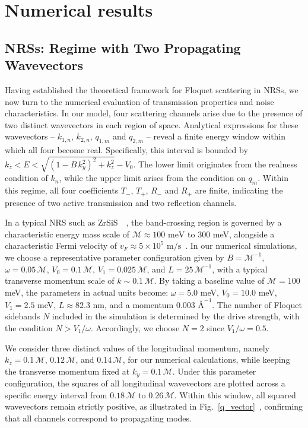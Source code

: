 \documentclass[aps,prb,onecolumn,longbibliography,nofootinbib,citeautoscript,10pt]{revtex4-2}
\begin{document}
\section{Numerical results}
\label{secresults}

\subsection{NRSs: Regime with Two Propagating Wavevectors}

Having established the theoretical framework for Floquet scattering in NRSs, we now turn to the numerical evaluation of transmission properties and noise characteristics. In our model, four scattering channels arise due to the presence of two distinct wavevectors in each region of space. Analytical expressions for these wavevectors – $k_{1,n}$, $k_{2,n}$, $q_{1,m}$ and $q_{2,m}$ – reveal a finite energy window within which all four become real. Specifically, this interval is bounded by $k_z<E<\sqrt{(1-B\, k_y^2)^2 +k_z^2}-V_0$. The lower limit originates from the realness condition of $k_n$, while the upper limit arises from the condition on $q_m$. Within this regime, all four coefficients $T_-$, $T_+$, $R_-$ and $R_+$ are finite, indicating the presence of two active transmission and two reflection channels.

In a typical NRS such as ZrSiS~\cite{fu_nodal19} \,,  the band-crossing region is governed by a characteristic energy mass scale of $\mathcal{M} \approx 100\text{ meV}$ to $300$ meV, alongside a characteristic Fermi velocity of $v_F \approx 5 \times 10^5\text{ m/s}$~\cite{fu_nodal19, schilling2017flat}. In our numerical simulations, we choose a representative parameter configuration given by $B = \mathcal{M}^{-1}$, $\omega = 0.05 \,\mathcal{M}$, $V_0 = 0.1\,\mathcal{M}$, $V_1 = 0.025 \,\mathcal{M}$, and $L = 25\,\mathcal{M}^{-1}$, with a typical transverse momentum scale of $k \sim 0.1\,\mathcal{M}$. By taking a baseline value of $\mathcal{M} = 100$ meV, the parameters in actual units become: $\omega = 5.0$ meV, $V_0 = 10.0$ meV, $V_1 = 2.5$ meV, $L \approx 82.3$ nm, and a momentum $0.003 \text{ \AA}^{-1}$. The number of Floquet sidebands $N$ included in the simulation is determined by the drive strength, with the condition $N>V_1/ \omega$. Accordingly, we choose $N = 2$ since $V_1/\omega=0.5$.

We consider three distinct values of the longitudinal momentum, namely $k_z = 0.1\,\mathcal{M}$, $0.12\,\mathcal{M}$, and $0.14\,\mathcal{M}$, for our numerical calculations, while keeping the transverse momentum fixed at $k_y = 0.1\,\mathcal{M}$. Under this parameter configuration, the squares of all longitudinal wavevectors are plotted across a specific energy interval from $0.18\,\mathcal{M}$ to $0.26\,\mathcal{M}$. Within this window, all squared wavevectors remain strictly positive, as illustrated in Fig.~\ref{q_vector} \,,  confirming that all channels correspond to propagating modes.
\end{document}
